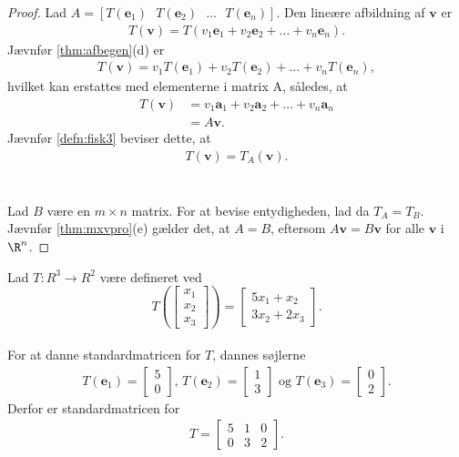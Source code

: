 \begin{proof}
Lad $A= [T(\mathbf{e}_1)\text{    } T(\mathbf{e}_2) \text{    } \ldots \text{    } T(\mathbf{e}_n)]$. 
Den lineære afbildning af $\mathbf{v}$ er
%
\begin{align*}
T(\mathbf{v})= T(v_1 \mathbf{e}_1+v_2 \mathbf{e}_2+ \ldots + v_n \mathbf{e}_n).
\end{align*}
%
Jævnfør \ref{thm:afbegen}(d) er
%
\begin{align*}
T(\mathbf{v})= v_1 T( \mathbf{e}_1)+ v_2 T( \mathbf{e}_2) + \ldots + v_n T( \mathbf{e}_n),
\end{align*}
%
hvilket kan erstattes med elementerne i matrix A, således, at
%
\begin{align*}
T(\mathbf{v})&= v_1 \mathbf{a}_1+ v_2 \mathbf{a}_2 + \ldots + v_n \mathbf{a}_n \\
&= A \mathbf{v}.
\end{align*}
Jævnfør \ref{defn:fisk3} beviser dette, at
%
\begin{align*}
T(\mathbf{v})= T_A (\mathbf{v}).
\end{align*}\\\\
%
Lad $B$ være en $m \times n$ matrix. 
For at bevise entydigheden, lad da $T_A=T_B$. 
Jævnfør \ref{thm:mxvpro}(e) gælder det, at $A=B$, eftersom $A \mathbf{v}=B \mathbf{v}$ for alle $\mathbf{v}$ i $\R^n$.
\end{proof}
%
\begin{eks}\label{entydigeks}
%
Lad $T: R^3 \rightarrow R^2$ være defineret ved 
$$T\left(
\begin{bmatrix}
x_1\\
x_2\\
x_3
\end{bmatrix}
\right)
=
\begin{bmatrix}%
5x_1+x_2\\
3x_2+2x_3
\end{bmatrix}.
$$ \\
For at danne standardmatricen for $T$, dannes søjlerne 
\begin{align*}
T(\mathbf{e}_1)=
\begin{bmatrix}
5\\
0
\end{bmatrix}\text{, }
T(\mathbf{e}_2)=
\begin{bmatrix}
1\\
3
\end{bmatrix}\text{ og }
T(\mathbf{e}_3)=
\begin{bmatrix}
0\\
2
\end{bmatrix}.
\end{align*}
Derfor er standardmatricen for
\begin{align*}
T=
\begin{bmatrix}
5 & 1 & 0\\
0 & 3 & 2
\end{bmatrix}.
\end{align*}
\end{eks}